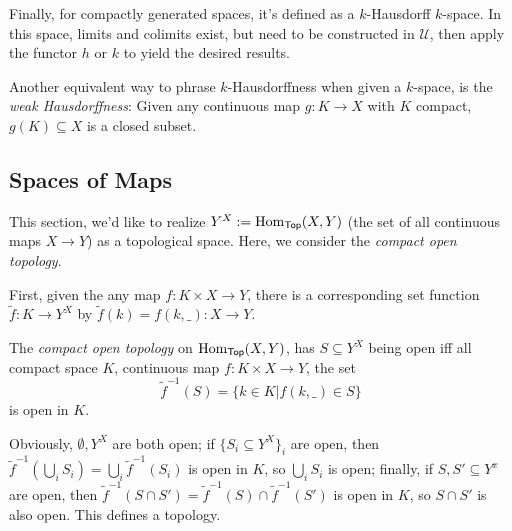 \documentclass{article}
\begin{document}
Finally, for compactly generated spaces, it's defined as a $k$-Hausdorff $k$-space. In this space, limits and colimits exist, but need to be constructed in $\mathcal{U}$, then apply the functor $h$ or $k$ to yield the desired results.

Another equivalent way to phrase $k$-Hausdorffness when given a $k$-space, is the \emph{weak Hausdorffness}: Given any continuous map $g:K\rightarrow X$ with $K$ compact, $g(K)\subseteq X$ is a closed subset.

\newpage

\subsection{Spaces of Maps}
This section, we'd like to realize $Y^X:=\mathrm{Hom}_{\mathsf{Top}}(X,Y)$ (the set of all continuous maps $X\rightarrow Y$) as a topological space. Here, we consider the \emph{compact open topology}.

First, given the any map $f:K\times X\rightarrow Y$, there is a corresponding set function $\tilde{f}:K\rightarrow Y^X$ by $\tilde{f}(k) = f(k,\_):X\rightarrow Y$. 
\begin{defn}
    The \emph{compact open topology} on $\mathrm{Hom}_{\mathsf{Top}} (X,Y)$, has $S\subseteq Y^X$ being open iff all compact space $K$, continuous map $f:K\times X\rightarrow Y$, the set 
    \[\tilde{f}^{-1}(S) = \{k\in K | f(k,\_)\in S\}\]
    is open in $K$.
\end{defn}
Obviously, $\emptyset, Y^X$ are both open; if $\{S_i\subseteq Y^X\}_i$ are open, then $\tilde{f}^{-1}(\bigcup_i S_i)=\bigcup_i \tilde{f}^{-1}(S_i)$ is open in $K$, so $\bigcup_i S_i$ is open; finally, if $S,S'\subseteq Y^x$ are open, then $\tilde{f}^{-1}(S\cap S')=\tilde{f}^{-1}(S)\cap \tilde{f}^{-1}(S')$ is open in $K$, so $S\cap S'$ is also open. This defines a topology.
\end{document}

